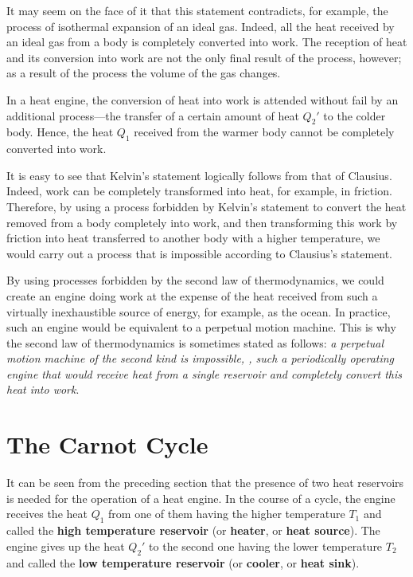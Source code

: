 It may seem on the face of it that this statement contradicts, for example, the process of isothermal expansion of an ideal gas. Indeed, all the heat received by an ideal gas from a body is completely converted into work. The reception of heat and its conversion into work are not the only final result of the process, however; as a result of the process the volume of the gas changes.

In a heat engine, the conversion of heat into work is attended without fail by an additional process---the transfer of a certain amount of heat $Q_2'$ to the colder body. Hence, the heat $Q_1$ received from the warmer body cannot be completely converted into work.

It is easy to see that Kelvin's statement logically follows from that of Clausius. Indeed, work can be completely transformed into heat, for example, in friction. Therefore, by using a process forbidden by Kelvin's statement to convert the heat removed from a body completely into work, and then transforming this work by friction into heat transferred to another body with a higher temperature, we would carry out a process that is impossible according to Clausius's statement.

By using processes forbidden by the second law of thermodynamics, we could create an engine doing work at the expense of the heat received from such a virtually inexhaustible source of energy, for example, as the ocean. In practice, such an engine would be equivalent to a perpetual motion machine. This is why the second law of thermodynamics is sometimes stated as follows: \textit{a perpetual motion machine of the second kind is impossible, \ie, such a periodically operating engine that would receive heat from a single reservoir and completely convert this heat into work}.

\section{The Carnot Cycle}\label{sec:12_2}

It can be seen from the preceding section that the presence of two heat reservoirs is needed for the operation of a heat engine. In the course of a cycle, the engine receives the heat $Q_1$ from one of them having the higher temperature $T_1$ and called the \textbf{high temperature reservoir} (or \textbf{heater}, or \textbf{heat source}). The engine gives up the heat $Q_2'$ to the second one having the lower temperature $T_2$ and called the \textbf{low temperature reservoir} (or \textbf{cooler}, or \textbf{heat sink}).

